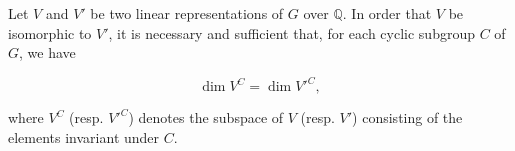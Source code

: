 Let $V$ and $V'$ be two linear representations of $G$ over $\mathbb{Q}$. In order that $V$ be isomorphic to $V'$, it is necessary and sufficient that, for each cyclic subgroup $C$ of $G$, we have

$$\dim V^C = \dim V'^{C},$$

where $V^C$ (resp. $V'^{C}$) denotes the subspace of $V$ (resp. $V'$) consisting of the elements invariant under $C$.
